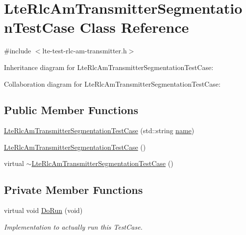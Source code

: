 \hypertarget{classLteRlcAmTransmitterSegmentationTestCase}{}\section{Lte\+Rlc\+Am\+Transmitter\+Segmentation\+Test\+Case Class Reference}
\label{classLteRlcAmTransmitterSegmentationTestCase}


{\ttfamily \#include $<$lte-\/test-\/rlc-\/am-\/transmitter.\+h$>$}



Inheritance diagram for Lte\+Rlc\+Am\+Transmitter\+Segmentation\+Test\+Case\+:


Collaboration diagram for Lte\+Rlc\+Am\+Transmitter\+Segmentation\+Test\+Case\+:
\subsection*{Public Member Functions}
\begin{DoxyCompactItemize}
\item 
\hyperlink{classLteRlcAmTransmitterSegmentationTestCase_a07e34899fffc7f1540ac686a75a3ae9c}{Lte\+Rlc\+Am\+Transmitter\+Segmentation\+Test\+Case} (std\+::string \hyperlink{generate__test__data__lte__spectrum__model_8m_ab74e6bf80237ddc4109968cedc58c151}{name})
\item 
\hyperlink{classLteRlcAmTransmitterSegmentationTestCase_ac1126dfec25d40f55f9fdb44cacfad02}{Lte\+Rlc\+Am\+Transmitter\+Segmentation\+Test\+Case} ()
\item 
virtual \hyperlink{classLteRlcAmTransmitterSegmentationTestCase_a18fe960de1e71f5e98153546aed20337}{$\sim$\+Lte\+Rlc\+Am\+Transmitter\+Segmentation\+Test\+Case} ()
\end{DoxyCompactItemize}
\subsection*{Private Member Functions}
\begin{DoxyCompactItemize}
\item 
virtual void \hyperlink{classLteRlcAmTransmitterSegmentationTestCase_a8bec2147bdbf3f5cade130c101a09374}{Do\+Run} (void)
\begin{DoxyCompactList}\small\item\em Implementation to actually run this Test\+Case. \end{DoxyCompactList}\end{DoxyCompactItemize}

